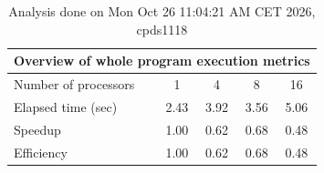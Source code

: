 \begin{table}[h]
\begin{center}
\begin{tabular}{|l|c|c|c|c|}
\hline
\multicolumn{5}{|c|}{Overview of whole program execution metrics} \\
\hline
\hline
Number of processors & 1 & 4 & 8 & 16 \\
\hline
Elapsed time (sec)      &       2.43 &       3.92 &       3.56 &       5.06 \\
\hline
Speedup                 &       1.00 &       0.62 &       0.68 &       0.48 \\
\hline
Efficiency              &       1.00 &       0.62 &       0.68 &       0.48 \\
\hline
\end{tabular}
\end{center}
\caption{ Analysis done on Mon Oct 26 11:04:21 AM CET 2026, cpds1118}
\end{table}
